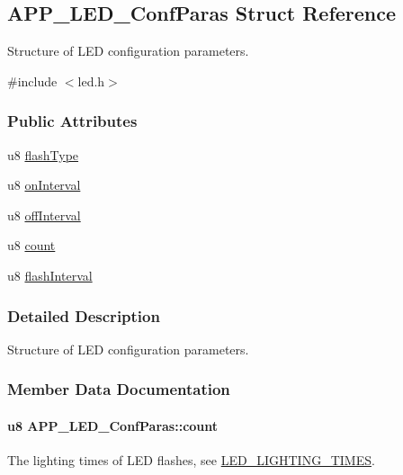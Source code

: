 \hypertarget{struct_a_p_p___l_e_d___conf_paras}{}\subsection{A\+P\+P\+\_\+\+L\+E\+D\+\_\+\+Conf\+Paras Struct Reference}
\label{struct_a_p_p___l_e_d___conf_paras}


Structure of L\+ED configuration parameters.  




{\ttfamily \#include $<$led.\+h$>$}

\subsubsection*{Public Attributes}
\begin{DoxyCompactItemize}
\item 
u8 \hyperlink{struct_a_p_p___l_e_d___conf_paras_a4e95d202a824c4d57db42c0ac9c7aaf1}{flash\+Type}
\item 
u8 \hyperlink{struct_a_p_p___l_e_d___conf_paras_a95ef3af47fa872313c97ba562f7ce47b}{on\+Interval}
\item 
u8 \hyperlink{struct_a_p_p___l_e_d___conf_paras_aa797a5e703f950b1109945d2cc9c3c6e}{off\+Interval}
\item 
u8 \hyperlink{struct_a_p_p___l_e_d___conf_paras_aecf3fd91f3d0e2fa2ad1ee43df8ca7d0}{count}
\item 
u8 \hyperlink{struct_a_p_p___l_e_d___conf_paras_a3334105f4c42cf49221b5b83f20d1f3e}{flash\+Interval}
\end{DoxyCompactItemize}


\subsubsection{Detailed Description}
Structure of L\+ED configuration parameters. 

\subsubsection{Member Data Documentation}
\paragraph[{\texorpdfstring{count}{count}}]{\setlength{\rightskip}{0pt plus 5cm}u8 A\+P\+P\+\_\+\+L\+E\+D\+\_\+\+Conf\+Paras\+::count}\hypertarget{struct_a_p_p___l_e_d___conf_paras_aecf3fd91f3d0e2fa2ad1ee43df8ca7d0}{}\label{struct_a_p_p___l_e_d___conf_paras_aecf3fd91f3d0e2fa2ad1ee43df8ca7d0}
The lighting times of L\+ED flashes, see \hyperlink{group___l_e_d___l_i_g_h_t_i_n_g___t_i_m_e_s}{L\+E\+D\+\_\+\+L\+I\+G\+H\+T\+I\+N\+G\+\_\+\+T\+I\+M\+ES}. 
